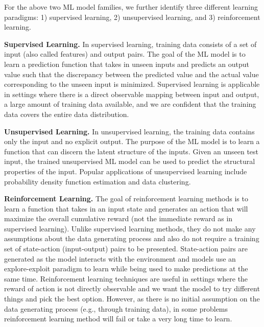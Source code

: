 For the above two ML model families, we further identify three different learning paradigms: 1) supervised learning, 2) unsupervised learning, and 3) reinforcement learning.

\vspace{2mm}
\noindent \textbf{Supervised Learning. } In supervised learning, training data consists of a set of input (also called features) and output pairs.
The goal of the ML model is to learn a prediction function that takes in unseen inputs and predicts an output value such that the discrepancy between the predicted value and the actual value corresponding to the unseen input is minimized.
Supervised learning is applicable in settings where there is a direct observable mapping between input and output, a large amount of training data available, and we are confident that the training data covers the entire data distribution.

\vspace{2mm}
\noindent \textbf{Unsupervised Learning. } In unsupervised learning, the training data contains only the input and no explicit output.
The purpose of the ML model is to learn a function that can discern the latent structure of the inputs.
Given an unseen test input, the trained unsupervised ML model can be used to predict the structural properties of the input.
Popular applications of unsupervised learning include probability density function estimation and data clustering.

\vspace{2mm}
\noindent \textbf{Reinforcement Learning. } The goal of reinforcement learning methods is to learn a function that takes in an input state and generates an action that will maximize the overall cumulative reward (not the immediate reward as in supervised learning).
Unlike supervised learning methods, they do not make any assumptions about the data generating process and also do not require a training set of state-action (input-output) pairs to be presented.
State-action pairs are generated as the model interacts with the environment and models use an explore-exploit paradigm to learn while being used to make predictions at the same time.
Reinforcement learning techniques are useful in settings where the reward of action is not directly observable and we want the model to try different things and pick the best option.
However, as there is no initial assumption on the data generating process (e.g., through training data), in some problems reinforcement learning method will fail or take a very long time to learn.